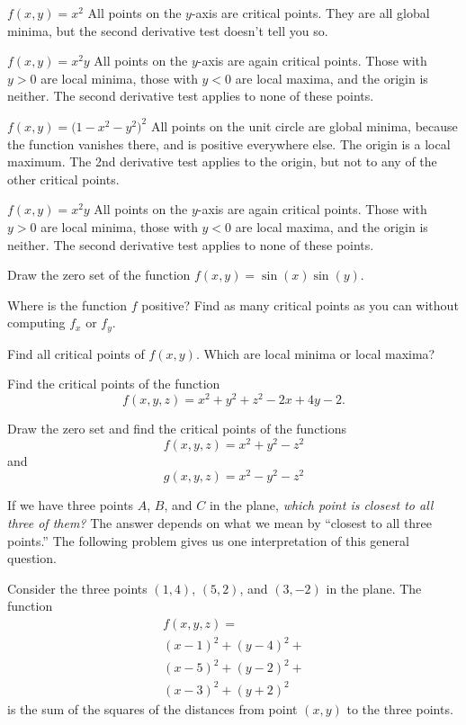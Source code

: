 \begin{multicols}{2}
\subprob $f(x,y) = x^2$ 
%
\answer  All points on the $y$-axis are critical points.  They are all  
global minima, but the second derivative test doesn't tell you so.
\endanswer

\subprob $f(x,y) = x^2y$ 
%
\answer  
All points on the $y$-axis are again critical points.  Those with
$y>0$ are local minima, those with $y<0$ are local maxima, and the
origin is neither.  The second derivative test applies to none of
these points.
\endanswer

\subprob $f(x,y) = \bigl(1-x^2-y^2\bigr)^2$ 
%
\answer  All points on the unit circle are global minima, because the  
function vanishes there, and is positive everywhere else.  The origin
is a local maximum.  The 2nd derivative test applies to the origin,
but not to any of the other critical points.
\endanswer

\subprob $f(x,y) = x^2y$ 
%
\answer  
All points on the $y$-axis are again critical points.  Those with
$y>0$ are local minima, those with $y<0$ are local maxima, and the
origin is neither.  The second derivative test applies to none of
these points.
\endanswer

\problem %

\subprob Draw the zero set of the function $f(x, y) = \sin(x) \sin(y)$.

\subprob Where is the function $f$ positive?  Find as many critical points as
you can without computing $f_x$ or $f_y$.

\subprob Find all critical points of $f(x, y)$.  Which are local minima or local
maxima?

\problem Find the critical points of the function 
\[
f(x, y, z) = x^2 + y^2 + z^2 - 2x + 4y -2.
\]

\problem Draw the zero set and find the critical points of the functions
\[
f(x, y, z) = x^2+y^2 - z^2
\]
and
\[
g(x, y, z) = x^2-y^2 - z^2
\]

\problem If we have three points $A$,  $B$, and $C$ in the plane, \textit{which point is closest to all three of them?}  The answer depends on what we mean by ``closest to all three points.''  The following problem gives us one interpretation of this general question.

Consider the three points $(1,4)$, $(5,2)$, and $(3,-2)$ in the plane.  The function 
\begin{multline*}
f(x, y, z) = \\
(x-1)^2+(y-4)^2+\\
(x-5)^2+(y-2)^2+\\
(x-3)^2+(y+2)^2
\end{multline*}
is the sum of the squares of the distances from point $(x,y)$ to the
three points.  


\end{multicols}
